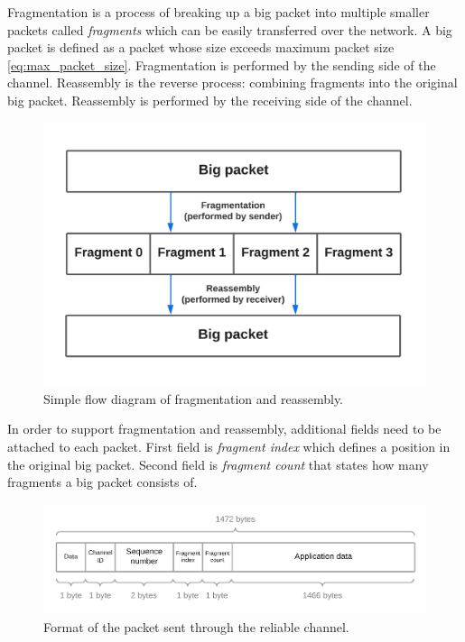 \documentclass[times, utf8, diplomski]{fer}
\begin{document}
Fragmentation is a process of breaking up a big packet into multiple smaller packets called \textit{fragments} which can be easily transferred over the network. A big packet is defined as a packet whose size exceeds maximum packet size \eqref{eq:max_packet_size}. Fragmentation is performed by the sending side of the channel. Reassembly is the reverse process: combining fragments into the original big packet. Reassembly is performed by the receiving side of the channel. \\

\begin{figure}[H]
	\centering
	\includegraphics[scale=0.3]{Fragmentation-and-reassembly}
	\caption{Simple flow diagram of fragmentation and reassembly.}
\end{figure}

In order to support fragmentation and reassembly, additional fields need to be attached to each packet. First field is \textit{fragment index} which defines a position in the original big packet. Second field is \textit{fragment count} that states how many fragments a big packet consists of.

\begin{figure}[H]
	\centering
	\includegraphics[scale=0.2]{Reliable-packet-structure}
	\caption{Format of the packet sent through the reliable channel.}
\end{figure}
\end{document}
